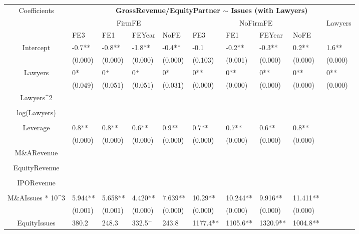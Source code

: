 \documentclass{article}
\begin{document}
\begin{table}[H]
\centering
\begin{tabular}{|clllllllll|}
\hline
\multirow{3}{*}{Coefficients} & \multicolumn{9}{c|}{\textbf{GrossRevenue/EquityPartner $\sim$ Issues (with Lawyers)}} \\
\cline{2-10}
& \multicolumn{4}{c}{FirmFE} & \multicolumn{4}{c}{NoFirmFE} & \multirow{2}{*}{Lawyers} \\
\cline{2-9}
& FE3 & FE1 & FEYear & NoFE & FE3 & FE1 & FEYear & NoFE &  \\
\hline
 
Intercept & -0.7** & -0.8** & -1.8** & -0.4** & -0.1 & -0.2** & -0.3** & 0.2** & 1.6** \\ 
   & (0.000) & (0.000) & (0.000) & (0.000) & (0.103) & (0.001) & (0.000) & (0.000) & (0.000) \\ 
  Lawyers & 0* & 0$^{+}$ & 0$^{+}$ & 0* & 0** & 0** & 0** & 0** & 0** \\ 
   & (0.049) & (0.051) & (0.051) & (0.031) & (0.000) & (0.000) & (0.000) & (0.000) & (0.000) \\ 
  Lawyers^2 &  &  &  &  &  &  &  &  &  \\ 
   &  &  &  &  &  &  &  &  &  \\ 
  log(Lawyers) &  &  &  &  &  &  &  &  &  \\ 
   &  &  &  &  &  &  &  &  &  \\ 
  Leverage & 0.8** & 0.8** & 0.6** & 0.9** & 0.7** & 0.7** & 0.6** & 0.8** &  \\ 
   & (0.000) & (0.000) & (0.000) & (0.000) & (0.000) & (0.000) & (0.000) & (0.000) &  \\ 
  M\&ARevenue &  &  &  &  &  &  &  &  &  \\ 
   &  &  &  &  &  &  &  &  &  \\ 
  EquityRevenue &  &  &  &  &  &  &  &  &  \\ 
   &  &  &  &  &  &  &  &  &  \\ 
  IPORevenue &  &  &  &  &  &  &  &  &  \\ 
   &  &  &  &  &  &  &  &  &  \\ 
  M\&AIssues * 10^3 & 5.944** & 5.658** & 4.420** & 7.639** & 10.29** & 10.244** & 9.916** & 11.411** &  \\ 
   & (0.001) & (0.001) & (0.000) & (0.000) & (0.000) & (0.000) & (0.000) & (0.000) &  \\ 
  EquityIssues & 380.2 & 248.3 & 332.5$^{+}$ & 243.8 & 1177.4** & 1105.6** & 1320.9** & 1004.8** &  \\ 

\end{tabular}
\end{table}
\end{document}
